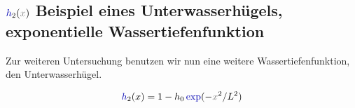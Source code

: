 \documentclass[10pt,fleqn,%
reqno,a4paper]{article}
\makeatletter
\def\mathcolor#1#{\@mathcolor{#1}}
\def\@mathcolor#1#2#3{%
        \protect\leavevmode
        \begingroup\color#1{#2}#3\endgroup
}
\newcommand{\nx}{\mathcolor{gray}{x}}
\newcommand{\ncos}{\mathcolor{blue!70!black}{\cos}}
\newcommand{\nexp}{\mathcolor{blue!70!black}{\exp}}
\newcommand{\nh}{\mathcolor{blue!70!black}{h}}
\makeatother
\begin{document}
\begin{comment}
Wenn sie auf den Rand treffen, werden sie durch den Sprung in der Wassertiefenfunktion gestört. 
Die Simulation wird unstabil. 
Um einen besseren Übergang zu erzeugen, setzen wir den linken Rand auch analytisch fort, so dass kein Sprung mehr in der Wassertiefenfunktion $ h(x) $ mehr vorkommt. 
Die neue Funktion $ h_2(x) $ ist definiert als:

\begin{align}
        \nh_2 (x) = 
        \begin{cases}
                \frac{1+h_0+(1-h_0)cos(\pi(\nx+I_l+L)/L)}{2} & I_l \leqslant  \nx \leqslant I_l+L\\
                1 &\nx < 0 \\
                \frac{1+h_0+(1-h_0)\ncos(\pi \nx/L))}{2} & 0< \nx < L\\
                h_0& \nx > L
        \end{cases}
\end{align}

$ I_l $ bezeichnet hier den linken Rand des Intervalls. 
Dadurch wird unsere Simulation an den Rändern nicht mehr stark gestört wie in den nachfolgenden Diagramm zu sehen ist.

\begin{figure}[htp!]
        \begin{center}
                \texttt{[image: \{Aufgabe-2/korteweg\_frame1-1-0.05-5.5-1.0-0.5-0.3]}.png}  
                \texttt{[image: \{Aufgabe-2/korteweg\_frame4000-1-0.05-5.5-1.0-0.5-0.3]}.png}  
                \texttt{[image: \{Aufgabe-2/korteweg\_frame8000-1-0.05-5.5-1.0-0.5-0.3]}.png}  
                \texttt{[image: \{Aufgabe-2/korteweg\_frame12000-1-0.05-5.5-1.0-0.5-0.3]}.png}  
                \caption{ }
        \end{center}
\end{figure}

\end{comment}

\subsection{$ \nh _2 (\nx) $ Beispiel eines Unterwasserhügels, exponentielle Wassertiefenfunktion}
Zur weiteren Untersuchung benutzen wir nun eine weitere Wassertiefenfunktion, den Unterwasserhügel. 

\begin{align}
\nh_2(x) = 1 - h_0 \nexp(-\nx^2/L^2 ) \label{eq:h2}
\end{align}
\end{document}
